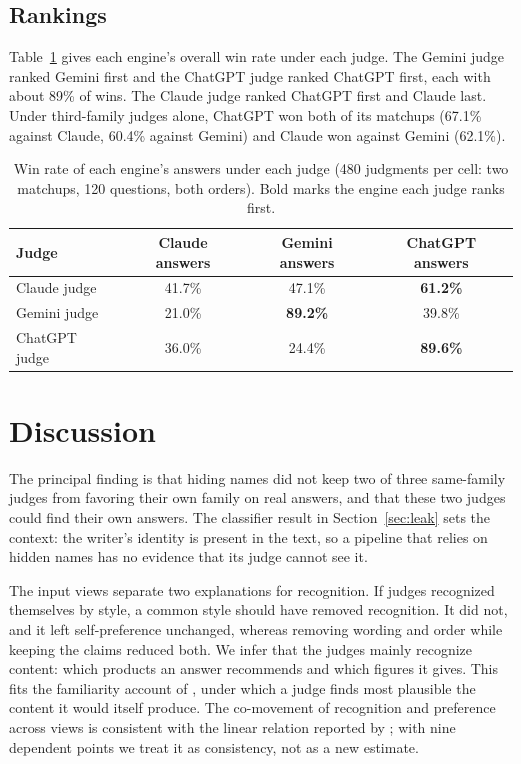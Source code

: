 \documentclass{article}
\begin{document}
\subsection{Rankings}
\label{sec:rank}

Table~\ref{tab:rank} gives each engine's overall win rate under each judge. The Gemini judge ranked Gemini first and the ChatGPT judge ranked ChatGPT first, each with about 89\% of wins. The Claude judge ranked ChatGPT first and Claude last. Under third-family judges alone, ChatGPT won both of its matchups (67.1\% against Claude, 60.4\% against Gemini) and Claude won against Gemini (62.1\%).

\begin{table}[t]
\centering
\caption{Win rate of each engine's answers under each judge (480 judgments per cell: two matchups, 120 questions, both orders). Bold marks the engine each judge ranks first.}
\label{tab:rank}
\begin{tabular}{lccc}
\toprule
Judge & Claude answers & Gemini answers & ChatGPT answers \\
\midrule
Claude judge & 41.7\% & 47.1\% & \textbf{61.2\%} \\
Gemini judge & 21.0\% & \textbf{89.2\%} & 39.8\% \\
ChatGPT judge & 36.0\% & 24.4\% & \textbf{89.6\%} \\
\bottomrule
\end{tabular}
\end{table}

\section{Discussion}
\label{sec:discussion}

The principal finding is that hiding names did not keep two of three same-family judges from favoring their own family on real answers, and that these two judges could find their own answers. The classifier result in Section~\ref{sec:leak} sets the context: the writer's identity is present in the text, so a pipeline that relies on hidden names has no evidence that its judge cannot see it.

The input views separate two explanations for recognition. If judges recognized themselves by style, a common style should have removed recognition. It did not, and it left self-preference unchanged, whereas removing wording and order while keeping the claims reduced both. We infer that the judges mainly recognize content: which products an answer recommends and which figures it gives. This fits the familiarity account of \citet{wataoka2024self}, under which a judge finds most plausible the content it would itself produce. The co-movement of recognition and preference across views is consistent with the linear relation reported by \citet{panickssery2024llm}; with nine dependent points we treat it as consistency, not as a new estimate.
\end{document}

